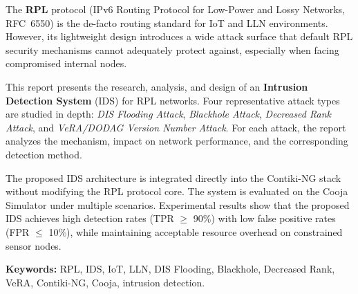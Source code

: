 The \textbf{RPL} protocol (IPv6 Routing Protocol for Low-Power and Lossy
Networks, RFC~6550) is the de-facto routing standard for IoT and LLN
environments. However, its lightweight design introduces a wide attack surface
that default RPL security mechanisms cannot adequately protect against,
especially when facing compromised internal nodes.

This report presents the research, analysis, and design of an \textbf{Intrusion
Detection System} (IDS) for RPL networks. Four representative attack types are
studied in depth: \textit{DIS Flooding Attack}, \textit{Blackhole Attack},
\textit{Decreased Rank Attack}, and \textit{VeRA/DODAG Version Number Attack}.
For each attack, the report analyzes the mechanism, impact on network
performance, and the corresponding detection method.

The proposed IDS architecture is integrated directly into the Contiki-NG stack
without modifying the RPL protocol core. The system is evaluated on the Cooja
Simulator under multiple scenarios. Experimental results show that the proposed
IDS achieves high detection rates (TPR $\geq$ 90\%) with low false positive
rates (FPR $\leq$ 10\%), while maintaining acceptable resource overhead on
constrained sensor nodes.

\vspace{0.5cm}
\noindent\textbf{Keywords:} RPL, IDS, IoT, LLN, DIS Flooding, Blackhole,
Decreased Rank, VeRA, Contiki-NG, Cooja, intrusion detection.

\cleardoublepage
